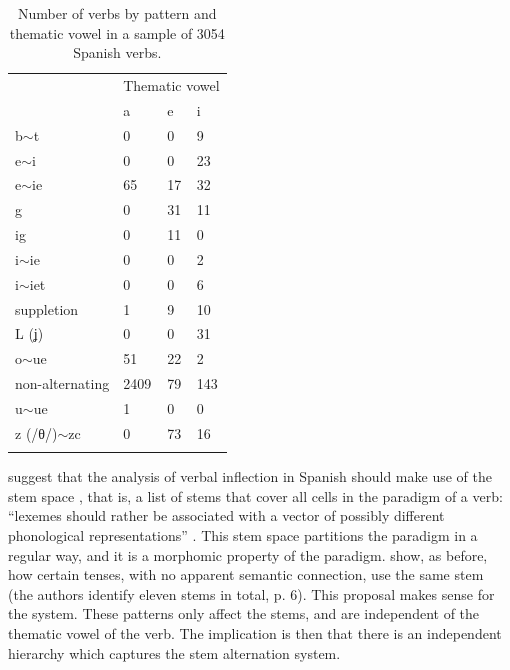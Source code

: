 \begin{table}[!htpb]
  \centering
  \begin{tabular}{llll}
    \lsptoprule
                    & \multicolumn{3}{c}{Thematic vowel} \\
                    & a    & e  & i                      \\
    \midrule
    b$\sim$t       & 0    & 0  & 9                      \\
    e$\sim$i        & 0    & 0  & 23                     \\
    e$\sim$ie       & 65   & 17 & 32                     \\
    g               & 0    & 31 & 11                     \\
    ig              & 0    & 11 & 0                      \\
    i$\sim$ie       & 0    & 0  & 2                      \\
    i$\sim$iet      & 0    & 0  & 6                      \\
    suppletion      & 1    & 9  & 10                     \\
    L (ʝ)           & 0    & 0  & 31                     \\
    o$\sim$ue       & 51   & 22 & 2                      \\
    non-alternating & 2409 & 79 & 143                    \\
    u$\sim$ue       & 1    & 0  & 0                      \\
    z (/θ/)$\sim$zc & 0    & 73 & 16                     \\
    \lspbottomrule
  \end{tabular}\caption{Number of verbs by pattern and thematic vowel in a sample of 3054 Spanish verbs.}\label{tab:sp-verb-minor-cross}
\end{table}

\textcite{Boye.2006} suggest that the analysis of verbal inflection in Spanish should make use of the stem space \autocite{Bonami.2003}, that is, a list of stems that cover all cells in the paradigm of a verb: ``lexemes  should  rather  be  associated  with  a  vector  of  possibly  different phonological  representations'' \autocite{Bonami.2006}. This stem space partitions the paradigm in a regular way, and it is a morphomic property of the paradigm. \textcite{Boye.2006} show, as \textcite{Maiden.2001} before, how certain tenses, with no apparent semantic connection, use the same stem (the authors identify eleven stems in total, p. 6). This proposal makes sense for the system. These patterns only affect the stems, and are independent of the thematic vowel of the verb. The implication is then that there is an independent hierarchy which captures the stem alternation system.

